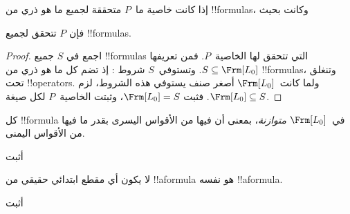\documentclass[../../../include/open-logic-section]{subfiles}
\begin{document}


\begin{thm}
  إذا كانت خاصية ما~$P$ متحققة لجميع ما هو ذري من !!{formula}s، وكانت
  بحيث
  \begin{enumerate}
  \end{enumerate}
  فإن $P$ تتحقق لجميع !!{formula}s.
\end{thm}

\begin{proof}
  اجمع في $S$ جميع !!{formula}s التي تتحقق لها الخاصية~$P$. فمن تعريفها
  $S \subseteq \Frm[L_0]$. وتستوفي~$S$ شروط
  : إذ تضم كل ما هو ذري من
  !!{formula}s، وتنغلق تحت !!{operator}s. ولما كانت~$\Frm[L_0]$ أصغر صنف يستوفي هذه الشروط، لزم
  $\Frm[L_0] \subseteq S$. فثبت $\Frm[L_0] = S$، وثبتت الخاصية~$P$ لكل صيغة.
\end{proof}

\begin{prop}
   كل !!{formula} في~$\Frm[L_0]$ \emph{متوازنة}، بمعنى أن فيها من
   الأقواس اليسرى بقدر ما فيها من الأقواس اليمنى.
\end{prop}

\begin{prob}
أثبت 
\end{prob}

\begin{prop} 
لا يكون أي مقطع ابتدائي حقيقي من !!a{formula} هو نفسه !!a{formula}.
\end{prop}

\begin{prob}
  أثبت 
\end{prob}
\end{document}
